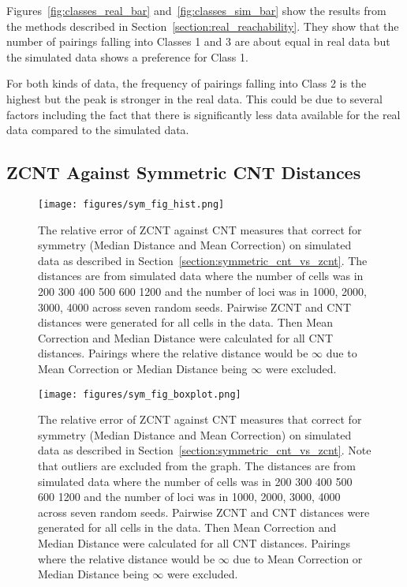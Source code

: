 Figures~\ref{fig:classes_real_bar} and~\ref{fig:classes_sim_bar} show the results from the methods described in Section~\ref{section:real_reachability}. They show that the number of pairings falling into Classes 1 and 3 are about equal in real data but the simulated data shows a preference for Class 1. 

For both kinds of data, the frequency of pairings falling into Class 2 is the highest but the peak is stronger in the real data. This could be due to several factors including the fact that there is significantly less data available for the real data compared to the simulated data. 

\subsection{ZCNT Against Symmetric CNT Distances}\label{section:symmetric_cnt_vs_zcnt_res}

\begin{figure}[ht]
    \centering 
    \texttt{[image: figures/sym\_fig\_hist.png]}
    \caption{The relative error of ZCNT against CNT measures that correct for symmetry (Median Distance and Mean Correction) on simulated data as described in Section~\ref{section:symmetric_cnt_vs_zcnt}. The distances are from simulated data where the number of cells was in {200 300 400 500 600 1200} and the number of loci was in {1000, 2000, 3000, 4000} across seven random seeds. Pairwise ZCNT and CNT distances were generated for all cells in the data. Then Mean Correction and Median Distance were calculated for all CNT distances. Pairings where the relative distance would be $\infty$ due to Mean Correction or Median Distance being $\infty$ were excluded.}\label{fig:symmetric_rel_err_hist}
\end{figure}

\begin{figure}[ht]
    \centering
    \texttt{[image: figures/sym\_fig\_boxplot.png]}
    \caption{The relative error of ZCNT against CNT measures that correct for symmetry (Median Distance and Mean Correction) on simulated data as described in Section~\ref{section:symmetric_cnt_vs_zcnt}. Note that outliers are excluded from the graph. The distances are from simulated data where the number of cells was in {200 300 400 500 600 1200} and the number of loci was in {1000, 2000, 3000, 4000} across seven random seeds. Pairwise ZCNT and CNT distances were generated for all cells in the data. Then Mean Correction and Median Distance were calculated for all CNT distances. Pairings where the relative distance would be $\infty$ due to Mean Correction or Median Distance being $\infty$ were excluded.}\label{fig:symmetric_rel_err_box}
\end{figure}

